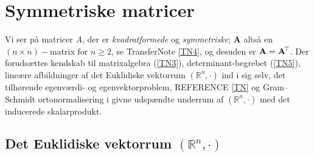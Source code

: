 









\setcounter{chapter}{112}


\chapter{Symmetriske matricer} \label{chpSymmMat}



\begin{basis}
Vi ser på matricer $A$, der er {\em{kvadratformede}} og {\em{symmetriske}};  $\mathbf{A}$  altså en $(n \times n)-$matrix for $n \geq 2$, se TransferNote \ref{TN4}, og desuden er $\mathbf{A} = \mathbf{A}\hspace*{-.6mm}^{\top}$. Der forudsættes kendskab til matrixalgebra (\ref{TN3}), determinant-begrebet (\ref{TN5}), lineære afbildninger af det Euklidiske vektorrum $(\mathbb{R}^{n}, \cdot)$ ind i sig selv, det tilhørende egenværdi- og egenvektorproblem, REFERENCE \ref{TN} og Gram--Schmidt ortonormalisering i givne udspændte underrum af $(\mathbb{R}^{n}, \cdot)$ med det inducerede skalarprodukt.
\end{basis}



\section{Det Euklidiske vektorrum $(\mathbb{R}^{n}, \cdot)$} \label{secNeed}

